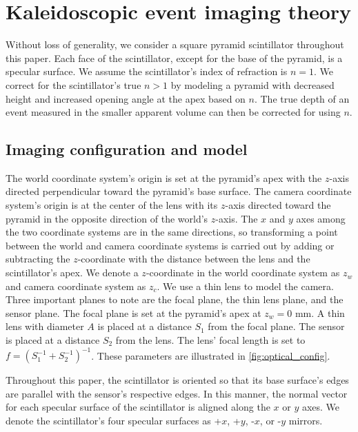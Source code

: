 
\section{Kaleidoscopic event imaging theory} \label{sec:theory}

Without loss of generality, we consider a square pyramid scintillator throughout 
this paper. 
Each face of the scintillator, except for the base of the pyramid, is a specular surface.
We assume the scintillator's index of refraction is $n=1$. 
We correct for the scintillator's true $n>1$ by modeling a pyramid with decreased 
height and increased opening angle at the apex based on $n$.
The true depth of an event measured in the smaller apparent volume can then be 
corrected for using $n$.

\subsection{Imaging configuration and model}

The world coordinate system's origin is set at the pyramid's apex with the 
$z$-axis directed perpendicular toward the pyramid's base surface.
The camera coordinate system's origin is at the center of the lens with its 
$z$-axis directed toward the pyramid in the opposite direction of the world's $z$-axis.
The $x$ and $y$ axes among the two coordinate systems are in the same directions, 
so transforming a point between the world and camera coordinate systems is 
carried out by adding or subtracting the $z$-coordinate with the distance between 
the lens and the scintillator's apex.
We denote a $z$-coordinate in the world coordinate system as $z_w$ and camera 
coordinate system as $z_c$.
We use a thin lens to model the camera.
Three important planes to note are the focal plane, the thin lens plane, and the 
sensor plane.
The focal plane is set at the pyramid's apex at $z_w=0$ mm.
A thin lens with diameter $A$ is placed at a distance $S_1$ from the focal plane. 
The sensor is placed at a distance $S_2$ from the lens.
The lens' focal length is set to $f=(S_1^{-1}+S_2^{-1})^{-1}$.
These parameters are illustrated in \cref{fig:optical_config}.

Throughout this paper, the scintillator is oriented so that its base surface's 
edges are parallel with the sensor's respective edges. 
In this manner, the normal vector for each specular surface of the scintillator is 
aligned along the $x$ or $y$ axes.
We denote the scintillator's four specular surfaces as +$x$, +$y$, -$x$, or -$y$ mirrors.

